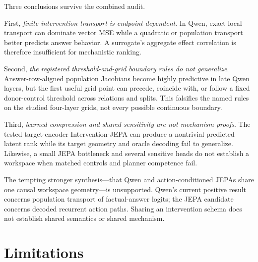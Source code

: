 \documentclass[10pt]{article}
\begin{document}
Three conclusions survive the combined audit.

First, \emph{finite intervention transport is endpoint-dependent}.  In Qwen,
exact local transport can dominate vector MSE while a quadratic or population
transport better predicts answer behavior.  A surrogate's aggregate effect
correlation is therefore insufficient for mechanistic ranking.

Second, \emph{the registered threshold-and-grid boundary rules do not
generalize}.  Answer-row-aligned population Jacobians become highly predictive
in late Qwen layers, but the first useful grid point can precede, coincide with,
or follow a fixed donor-control threshold across relations and splits.  This
falsifies the named rules on the studied four-layer grids, not every possible
continuous boundary.

Third, \emph{learned compression and shared sensitivity are not mechanism
proofs}.  The tested target-encoder Intervention-JEPA can produce a nontrivial predicted
latent rank while its target geometry and oracle decoding fail to generalize.
Likewise, a small JEPA bottleneck and several sensitive heads do not establish
a workspace when matched controls and planner competence fail.

The tempting stronger synthesis---that Qwen and action-conditioned JEPAs share
one causal workspace geometry---is unsupported.  Qwen's current positive
result concerns population transport of factual-answer logits; the JEPA
candidate concerns decoded recurrent action paths.  Sharing an intervention
schema does not establish shared semantics or shared mechanism.

\section{Limitations}
\end{document}
